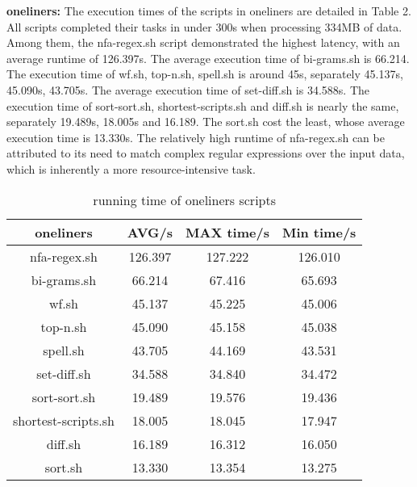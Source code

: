 \documentclass[sigplan, screen, 10pt]{acmart}
\begin{document}
\textbf{oneliners:}
The execution times of the scripts in oneliners are detailed in Table 2.
All scripts completed their tasks in under 300s when processing 334MB of data.
Among them, the nfa-regex.sh script demonstrated the highest latency, with an average runtime of 126.397s.
The average execution time of bi-grams.sh is 66.214.
The execution time of wf.sh, top-n.sh, spell.sh is around 45s, separately 45.137s, 45.090s, 43.705s.
The average execution time of set-diff.sh is 34.588s.
The execution time of sort-sort.sh, shortest-scripts.sh and diff.sh is nearly the same, separately 19.489s, 18.005s and 16.189.
The sort.sh cost the least, whose average execution time is 13.330s.
The relatively high runtime of nfa-regex.sh can be attributed to its need to match complex regular expressions over the input data, which is inherently a more resource-intensive task.
\begin{table}[]
    \centering
    \begin{tabular}{c|c|c|c}
        \textbf{oneliners}& \textbf{AVG/s} & \textbf{MAX time/s} & \textbf{Min time/s} \\
         \hline
         nfa-regex.sh & 126.397 & 127.222 & 126.010 \\
         bi-grams.sh & 66.214 & 67.416 & 65.693\\
         wf.sh & 45.137 & 45.225 & 45.006 \\
         top-n.sh & 45.090 & 45.158 & 45.038 \\
         spell.sh & 43.705 & 44.169 & 43.531 \\
         set-diff.sh & 34.588 & 34.840 & 34.472\\
         sort-sort.sh & 19.489 & 19.576 & 19.436 \\
         shortest-scripts.sh & 18.005 & 18.045 & 17.947\\
         diff.sh & 16.189 & 16.312 & 16.050 \\
         sort.sh & 13.330 & 13.354 & 13.275 \\
         \hline
    \end{tabular}
    \caption{running time of oneliners scripts}
\end{table}
\end{document}
